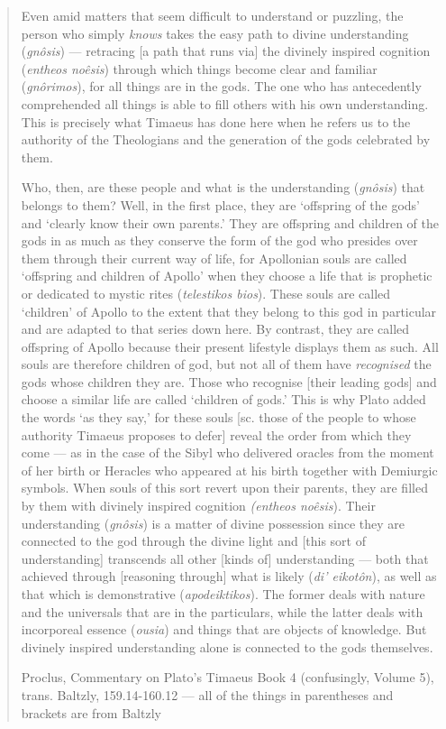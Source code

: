 \documentclass[
]{book}
\begin{document}
\begin{quote}
Even amid matters that seem difficult to understand or puzzling, the person who simply \emph{knows} takes the easy path to divine understanding (\emph{gnôsis}) --- retracing {[}a path that runs via{]} the divinely inspired cognition (\emph{entheos noêsis}) through which things become clear and familiar (\emph{gnôrimos}), for all things are in the gods. The one who has antecedently comprehended all things is able to fill others with his own understanding. This is precisely what Timaeus has done here when he refers us to the authority of the Theologians and the generation of the gods celebrated by them.

Who, then, are these people and what is the understanding (\emph{gnôsis}) that belongs to them? Well, in the first place, they are `offspring of the gods' and `clearly know their own parents.' They are offspring and children of the gods in as much as they conserve the form of the god who presides over them through their current way of life, for Apollonian souls are called `offspring and children of Apollo' when they choose a life that is prophetic or dedicated to mystic rites (\emph{telestikos bios}). These souls are called `children' of Apollo to the extent that they belong to this god in particular and are adapted to that series down here. By contrast, they are called offspring of Apollo because their present lifestyle displays them as such. All souls are therefore children of god, but not all of them have \emph{recognised} the gods whose children they are. Those who recognise {[}their leading gods{]} and choose a similar life are called `children of gods.' This is why Plato added the words `as they say,' for these souls {[}sc. those of the people to whose authority Timaeus proposes to defer{]} reveal the order from which they come --- as in the case of the Sibyl who delivered oracles from the moment of her birth or Heracles who appeared at his birth together with Demiurgic symbols. When souls of this sort revert upon their parents, they are filled by them with divinely inspired cognition \emph{(entheos noêsis}). Their understanding (\emph{gnôsis}) is a matter of divine possession since they are connected to the god through the divine light and {[}this sort of understanding{]} transcends all other {[}kinds of{]} understanding --- both that achieved through {[}reasoning through{]} what is likely (\emph{di' eikotôn}), as well as that which is demonstrative (\emph{apodeiktikos}). The former deals with nature and the universals that are in the particulars, while the latter deals with incorporeal essence (\emph{ousia}) and things that are objects of knowledge. But divinely inspired understanding alone is connected to the gods themselves.

Proclus, Commentary on Plato's Timaeus Book 4 (confusingly, Volume 5), trans. Baltzly, 159.14-160.12 --- all of the things in parentheses and brackets are from Baltzly
\end{quote}
\end{document}
